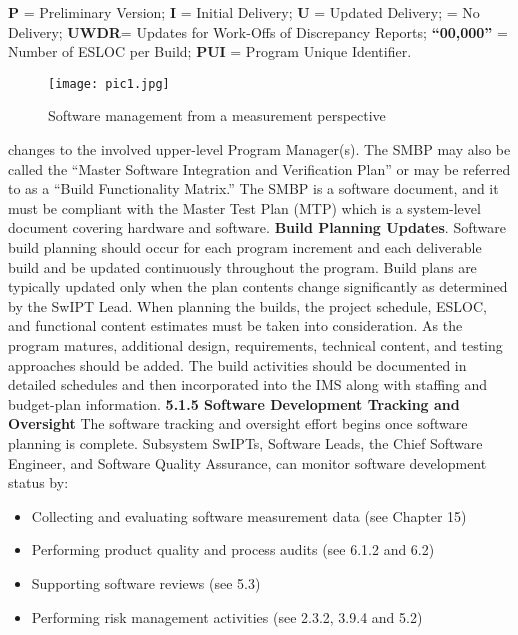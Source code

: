 \documentclass{book}
\begin{document}
	\textbf{P} = Preliminary Version; \textbf{I} = Initial Delivery; \textbf{U} = Updated Delivery; \textbf{} = No Delivery; \textbf{UWDR}= Updates for Work-Offs of
	Discrepancy Reports;\textbf{ “00,000”} = Number of ESLOC per Build; \textbf{PUI} = Program Unique Identifier.%
	\begin{figure}[h]
		\centering
		\texttt{[image: pic1.jpg]}
		\caption{Software management from a measurement perspective}
		\label{pic1}
	\end{figure}
	\begin{multicols}{2}
		changes to the involved upper-level Program Manager(s). The
		SMBP may also be called the “Master Software Integration
		and Verification Plan” or may be referred to as a “Build
		Functionality Matrix.” The SMBP is a software document,
		and it must be compliant with the Master Test Plan (MTP)
		which is a system-level document covering hardware and
		software.
		\textbf{Build Planning Updates}. Software build planning
		should occur for each program increment and each deliverable build and be updated continuously throughout the program. Build plans are typically updated only when the plan
		contents change significantly as determined by the SwIPT
		Lead.
		When planning the builds, the project schedule, ESLOC,
		and functional content estimates must be taken into consideration. As the program matures, additional design, requirements, technical content, and testing approaches should be
		added. The build activities should be documented in detailed
		schedules and then incorporated into the IMS along with
		staffing and budget-plan information.
		\textbf{5.1.5 Software Development
			Tracking and Oversight}
		The software tracking and oversight effort begins once software planning is complete. Subsystem SwIPTs, Software
		Leads, the Chief Software Engineer, and Software Quality
		Assurance, can monitor software development status by:
		\begin{itemize}
		\item Collecting and evaluating software measurement data
			(see Chapter 15)
		\item Performing product quality and process audits (see
			6.1.2 and 6.2)
		\item Supporting software reviews (see 5.3)
		\item Performing risk management activities (see 2.3.2, 3.9.4
			and 5.2) 
		\end{itemize}
		

\end{multicols}
\end{document}

